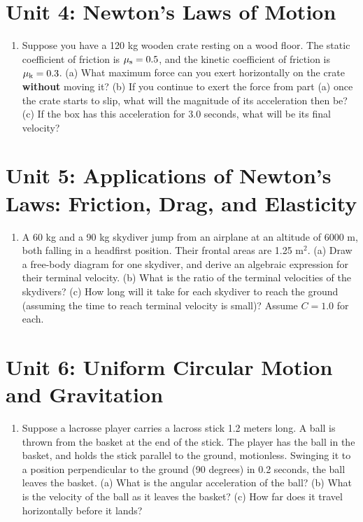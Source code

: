 \documentclass[10pt]{article}
\begin{document}
\section{Unit 4: Newton's Laws of Motion}
\begin{enumerate}
\item Suppose you have a 120 kg wooden crate resting on a wood floor.  The static coefficient of friction is $\mu_{\rm s} = 0.5$, and the kinetic coefficient of friction is $\mu_{\rm k} = 0.3$.  (a) What maximum force can you exert horizontally on the crate \textbf{without} moving it?  (b) If you continue to exert the force from part (a) once the crate starts to slip, what will the magnitude of its acceleration then be?  (c) If the box has this acceleration for 3.0 seconds, what will be its final velocity? \\ \vspace{3cm}
\end{enumerate}

\section{Unit 5: Applications  of Newton's Laws: Friction, Drag, and Elasticity}
\begin{enumerate}
\item A 60 kg and a 90 kg skydiver jump from an airplane at an altitude of 6000 m, both falling in a headfirst position.  Their frontal areas are 1.25 m$^2$.  (a) Draw a free-body diagram for one skydiver, and derive an algebraic expression for their terminal velocity.  (b) What is the ratio of the terminal velocities of the skydivers?  (c) How long will it take for each skydiver to reach the ground (assuming the time to reach terminal velocity is small)?  Assume $C = 1.0$ for each. \\ \vspace{2.75cm}
\end{enumerate}

\section{Unit 6: Uniform Circular Motion and Gravitation}
\begin{enumerate}
\item Suppose a lacrosse player carries a lacross stick 1.2 meters long.  A ball is thrown from the basket at the end of the stick.  The player has the ball in the basket, and holds the stick parallel to the ground, motionless.  Swinging it to a position perpendicular to the ground (90 degrees) in 0.2 seconds, the ball leaves the basket.  (a) What is the angular acceleration of the ball?  (b) What is the velocity of the ball as it leaves the basket?  (c) How far does it travel horizontally before it lands? \\ \vspace{3cm}
\end{enumerate}
\end{document}
